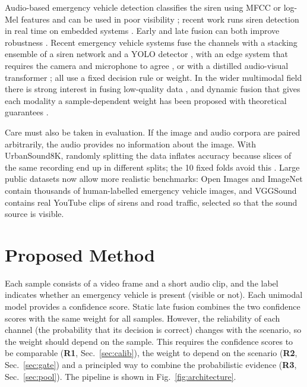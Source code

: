 \documentclass[runningheads,a4paper]{llncs}
\begin{document}
Audio-based emergency vehicle detection classifies the siren using MFCC or
log-Mel features and can be used in poor visibility \cite{sun2021}; recent work
runs siren detection in real time on embedded systems \cite{giordano2025}.
Early and late fusion can both improve robustness \cite{baltrusaitis2019}.
Recent emergency vehicle systems fuse the channels with a stacking ensemble of
a siren network and a YOLO detector \cite{zohaib2024}, with an edge system that
requires the camera and microphone to agree \cite{kristiawan2026}, or with a
distilled audio-visual transformer \cite{john2026}; all use a fixed decision
rule or weight. In the wider multimodal field there is strong interest in
fusing low-quality data \cite{zhang2024survey}, and dynamic fusion that gives
each modality a sample-dependent weight has been proposed with theoretical
guarantees \cite{cao2024}.

Care must also be taken in evaluation. If the image and audio corpora are
paired arbitrarily, the audio provides no information about the image. With
UrbanSound8K, randomly splitting the data inflates accuracy because slices
of the same recording end up in different splits; the 10 fixed folds avoid
this \cite{salamon2014}. Large public datasets now allow more realistic
benchmarks: Open Images \cite{kuznetsova2020} and ImageNet
\cite{russakovsky2015} contain thousands of human-labelled emergency vehicle
images, and VGGSound \cite{chen2020} contains real YouTube clips of sirens and
road traffic, selected so that the sound source is visible.

\section{Proposed Method}

Each sample consists of a video frame and a short audio clip, and the label
indicates whether an emergency vehicle is present (visible or not). Each
unimodal model provides a confidence score. Static late fusion combines the two
confidence scores with the same weight for all samples. However, the
reliability of each channel (the probability that its decision is correct)
changes with the scenario, so the weight should depend on the sample. This
requires the confidence scores to be comparable (\textbf{R1},
Sec.~\ref{sec:calib}), the weight to depend on the scenario (\textbf{R2},
Sec.~\ref{sec:gate}) and a principled way to combine the probabilistic
evidence (\textbf{R3}, Sec.~\ref{sec:pool}). The pipeline is shown in
Fig.~\ref{fig:architecture}.
\end{document}
